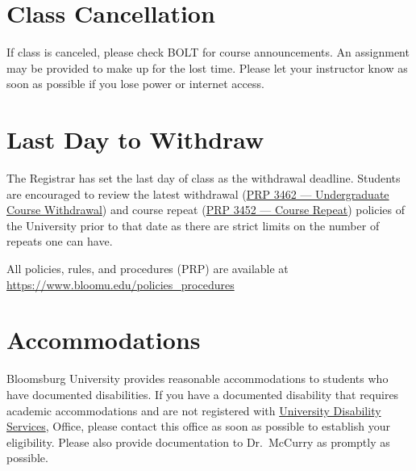 \documentclass[11pt,letterpaper]{article}
\begin{document}
\section{Class Cancellation}
If class is canceled, please check BOLT for course announcements. An assignment
may be provided to make up for the lost time. 
Please let your instructor know as soon as possible if you lose power or
internet access.



\section{Last Day to Withdraw}
The Registrar has set the last day of class as the withdrawal deadline.
Students are encouraged to review the latest withdrawal
(\href{https://intranet.bloomu.edu/policies_procedures}{PRP 3462 ---
Undergraduate Course Withdrawal}) and course repeat
(\href{https://intranet.bloomu.edu/policies_procedures}{PRP 3452 --- Course
Repeat}) policies of the University prior to that date as there are strict
limits on the number of repeats one can have. 

\begin{mdframed}
	\centering
	All policies, rules, and procedures (PRP) are available at
	\url{https://www.bloomu.edu/policies_procedures}
\end{mdframed}

\section{Accommodations}
Bloomsburg University provides reasonable accommodations to students who have
documented disabilities. If you have a documented disability that requires
academic accommodations and are not registered with 
\href{https://intranet.bloomu.edu/disabilities}{University Disability Services},
Office, please contact this office as soon as possible to establish your
eligibility. Please also provide documentation to Dr.\ McCurry as promptly as
possible.
\end{document}
